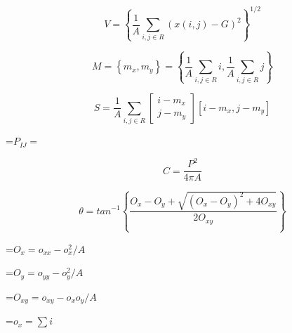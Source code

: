 {\newpage
\clearpage
\samepage \begin{displaymath}V =  \left \{ \frac{1}{A} \sum_{i,j \in R} \left ( x(i,j) - G \right )^2 \right \}^{1/2} \end{displaymath}
}

{\newpage
\clearpage
\samepage \begin{displaymath}M = \left \{ m_x , m_y \right \}= \left \{ \frac{1}{A} \sum_{i,j \in R} i  ,
 \frac{1}{A} \sum_{i,j \in R} j  \right \}
\end{displaymath}
}

{\newpage
\clearpage
\samepage \begin{displaymath}S = \frac{1}{A} \sum_{i,j \in R} \left [ \begin{array}{c} i-m_x \\  j-m_y 
\end{array} \right ] \left [ i-m_x,  j-m_y \right ] \end{displaymath}
}

{\newpage
\clearpage
\samepage \setbox\sizebox=\hbox{$P_{IJ} = $}\box\sizebox
}

{\newpage
\clearpage
\samepage \begin{displaymath}C = \frac{P^2}{4 \pi A} \end{displaymath}
}

{\newpage
\clearpage
\samepage \begin{displaymath}%
\theta = tan^{-1} \left \{ \frac{O_x-O_y + \sqrt{(O_x-O_y)^2+4O_{xy}}} {2 O_{xy}} \right \}
\end{displaymath}
}

{\newpage
\clearpage
\samepage \setbox\sizebox=\hbox{$O_x =o_{xx} - o_x^2/A$}\box\sizebox
}

{\newpage
\clearpage
\samepage \setbox\sizebox=\hbox{$O_y =o_{yy} - o_y^2/A$}\box\sizebox
}

{\newpage
\clearpage
\samepage \setbox\sizebox=\hbox{$O_{xy} =o_{xy} - o_xo_y/A$}\box\sizebox
}

{\newpage
\clearpage
\samepage \setbox\sizebox=\hbox{$o_x = \sum i$}\box\sizebox
}

